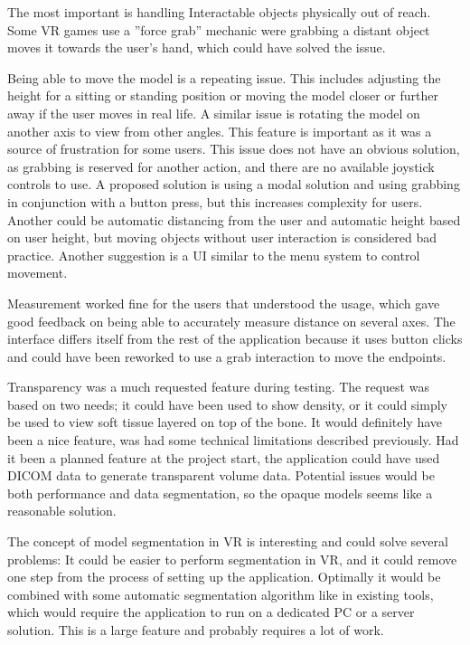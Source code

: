 \documentclass[a4paper]{report}
\begin{document}
The most important is handling Interactable objects physically out of reach. Some VR games use a ''force grab'' mechanic were grabbing a distant object moves it towards the user's hand, which could have solved the issue.

Being able to move the model is a repeating issue. This includes adjusting the height for a sitting or standing position or moving the model closer or further away if the user moves in real life. A similar issue is rotating the model on another axis to view from other angles. This feature is important as it was a source of frustration for some users.
This issue does not have an obvious solution, as grabbing is reserved for another action, and there are no available joystick controls to use. A proposed solution is using a modal solution and using grabbing in conjunction with a button press, but this increases complexity for users. Another could be automatic distancing from the user and automatic height based on user height, but moving objects without user interaction is considered bad practice. Another suggestion is a UI similar to the menu system to control movement.

Measurement worked fine for the users that understood the usage, which gave good feedback on being able to accurately measure distance on several axes. The interface differs itself from the rest of the application because it uses button clicks and could have been reworked to use a grab interaction to move the endpoints.

Transparency was a much requested feature during testing. The request was based on two needs; it could have been used to show density, or it could simply be used to view soft tissue layered on top of the bone. It would definitely have been a nice feature, was had some technical limitations described previously. Had it been a planned feature at the project start, the application could have used DICOM data to generate transparent volume data. Potential issues would be both performance and data segmentation, so the opaque models seems like a reasonable solution.

The concept of model segmentation in VR is interesting and could solve several problems: It could be easier to perform segmentation in VR, and it could remove one step from the process of setting up the application.
Optimally it would be combined with some automatic segmentation algorithm like in existing tools, which would require the application to run on a dedicated PC or a server solution.
This is a large feature and probably requires a lot of work.
\end{document}
